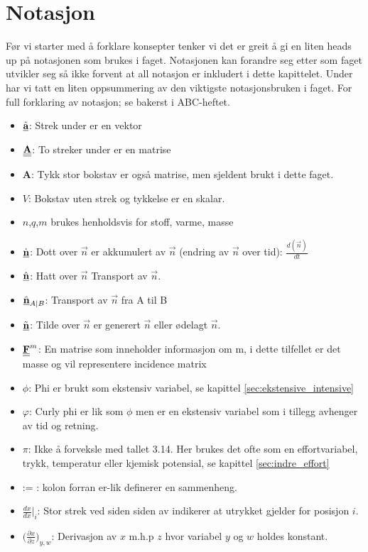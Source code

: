 \clearpage
\section{Notasjon}\label{sec:notasjon}

Før vi starter med å forklare konsepter tenker vi det er greit å gi en liten heads up på notasjonen som brukes i faget. Notasjonen kan forandre seg etter som faget utvikler seg så ikke forvent at all notasjon er inkludert i dette kapittelet. Under har vi tatt en liten oppsummering av den viktigste notasjonsbruken i faget. For full forklaring av notasjon; se bakerst i ABC-heftet.

\begin{itemize}
    \item $\underline{\hat{\textbf{a}}}$: Strek under er en vektor
    \item $\underline{\underline{\textbf{A}}}$: To streker under er en matrise
    \item $\textbf{A}$: Tykk stor bokstav er også matrise, men sjeldent brukt i dette faget.
    \item $V$: Bokstav uten strek og tykkelse er en skalar.
    \item $n$,$q$,$m$ brukes henholdsvis for stoff, varme, masse
    \item $\underline{\dot{\textbf{n}}}$: Dott over $\vec{n}$ er akkumulert av $\vec{n}$ (endring av $\vec{n}$ over tid): $\frac{d(\vec{n})}{dt}$
    \item $\underline{\hat{\textbf{n}}}$: Hatt over $\vec{n}$ Transport av $\vec{n}$.
    \item $\underline{\hat{\textbf{n}}}_{A|B}$: Transport av $\vec{n}$ fra A til B
    \item $\underline{\Tilde{\textbf{n}}}$: Tilde over $\vec{n}$ er generert $\vec{n}$ eller ødelagt $\vec{n}$.  
    \item $\underline{\underline{\textbf{F}}}^m$: En matrise som inneholder informasjon om m, i dette tilfellet er det masse og vil representere incidence matrix 
    \item \textbf{$\phi$}: Phi er brukt som ekstensiv variabel, se kapittel \ref{sec:ekstensive_intensive}
    \item \textbf{$\varphi$}: Curly phi er lik som $\phi$ men er en ekstensiv variabel som i tillegg avhenger av tid og retning. 
    \item \textbf{$\pi$}: Ikke å forveksle med tallet 3.14. Her brukes det ofte som en effortvariabel, trykk, temperatur eller kjemisk potensial, se kapittel \ref{sec:indre_effort} 
    \item := : kolon forran er-lik definerer en sammenheng.
    \item $\frac{dx}{dx}\Big|_i$: Stor strek ved siden siden av indikerer at utrykket gjelder for posisjon $i$.
    \item $\Big(\frac{\partial x}{\partial z}\Big)_{y,w}$: Derivasjon av $x$ m.h.p $z$ hvor variabel $y$ og $w$ holdes konstant.
\end{itemize}

\clearpage
